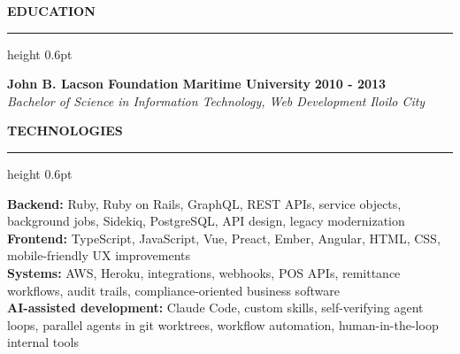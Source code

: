 \documentclass[10pt,letterpaper]{article}
\newcommand{\sectionheading}[1]{%
  \vspace{11pt}
  {\large\bfseries\MakeUppercase{#1}}\par
  \vspace{1pt}
  \hrule height 0.6pt
  \vspace{5pt}
}
\begin{document}
\sectionheading{Education}
\textbf{John B. Lacson Foundation Maritime University} \hfill \textbf{2010 - 2013}\\
\textit{Bachelor of Science in Information Technology, Web Development} \hfill \textit{Iloilo City}

\sectionheading{Technologies}
\textbf{Backend:} Ruby, Ruby on Rails, GraphQL, REST APIs, service objects, background jobs, Sidekiq, PostgreSQL, API design, legacy modernization\\
\textbf{Frontend:} TypeScript, JavaScript, Vue, Preact, Ember, Angular, HTML, CSS, mobile-friendly UX improvements\\
\textbf{Systems:} AWS, Heroku, integrations, webhooks, POS APIs, remittance workflows, audit trails, compliance-oriented business software\\
\textbf{AI-assisted development:} Claude Code, custom skills, self-verifying agent loops, parallel agents in git worktrees, workflow automation, human-in-the-loop internal tools
\end{document}
